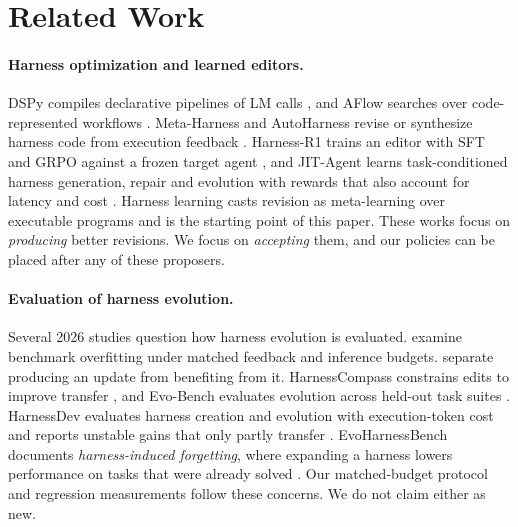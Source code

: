 \section{Related Work}
\label{sec:related}

\paragraph{Harness optimization and learned editors.}
DSPy compiles declarative pipelines of LM calls \citep{khattab2024dspy}, and AFlow searches over
code-represented workflows \citep{zhang2025aflow}. Meta-Harness and AutoHarness revise or synthesize
harness code from execution feedback \citep{lee2026metaharness,lou2026autoharness}. Harness-R1 trains an
editor with SFT and GRPO against a frozen target agent \citep{shao2026harnessr1}, and JIT-Agent learns
task-conditioned harness generation, repair and evolution with rewards that also account for latency and
cost \citep{zhang2026jitagent}. Harness learning \citep{zhang2026harnesslearning} casts revision as
meta-learning over executable programs and is the starting point of this paper. These works focus on
\emph{producing} better revisions. We focus on \emph{accepting} them, and our policies can be placed
after any of these proposers.

\paragraph{Evaluation of harness evolution.}
Several 2026 studies question how harness evolution is evaluated. \citet{wang2026rethinking} examine
benchmark overfitting under matched feedback and inference budgets. \citet{lin2026updating} separate
producing an update from benefiting from it. HarnessCompass constrains edits to improve transfer
\citep{zhang2026harnesscompass}, and Evo-Bench evaluates evolution across held-out task suites
\citep{huang2026evobench}. HarnessDev evaluates harness creation and evolution with execution-token
cost and reports unstable gains that only partly transfer \citep{wu2026harnessdev}. EvoHarnessBench
documents \emph{harness-induced forgetting}, where expanding a harness lowers performance on tasks that
were already solved \citep{ke2026evoharnessbench}. Our matched-budget protocol and regression
measurements follow these concerns. We do not claim either as new.

